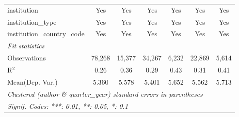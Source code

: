 \begin{tabular}{lcccccc}
   institution                  & Yes           & Yes           & Yes          & Yes     & Yes         & Yes\\  
   institution\_type            & Yes           & Yes           & Yes          & Yes     & Yes         & Yes\\  
   institution\_country\_code   & Yes           & Yes           & Yes          & Yes     & Yes         & Yes\\  
   \midrule
   \emph{Fit statistics}\\
   Observations                 & 78,268        & 15,377        & 34,267       & 6,232   & 22,869      & 5,614\\  
   R$^2$                        & 0.26          & 0.36          & 0.29         & 0.43    & 0.31        & 0.41\\  
Mean(Dep. Var.) & 5.360 & 5.578 & 5.401 & 5.652 & 5.562 & 5.713 \\
   \midrule \midrule
   \multicolumn{7}{l}{\emph{Clustered (author \& quarter\_year) standard-errors in parentheses}}\\
   \multicolumn{7}{l}{\emph{Signif. Codes: ***: 0.01, **: 0.05, *: 0.1}}\\
\end{tabular}
\par\endgroup
